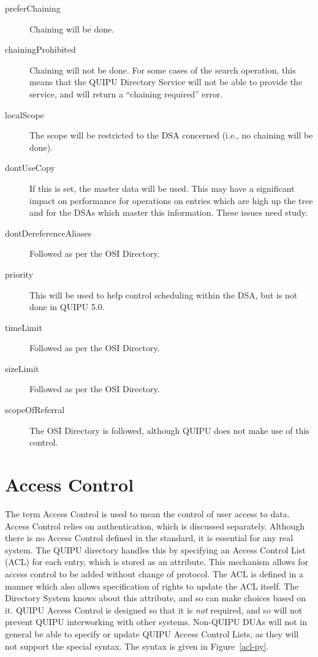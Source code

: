 \begin {description}
\item [preferChaining]
Chaining will be done.

\item [chainingProhibited]
Chaining will not be done.
For some cases of the search operation, this means that the QUIPU Directory
Service will not be able to provide the service, and will return a
``chaining required'' error.


\item [localScope]
The scope will be restricted to the DSA concerned (i.e., no chaining will be
done).

\item [dontUseCopy] If this is set, the master data will be used.  This may
have a significant impact on performance for operations on entries which are
high up the tree and for the DSAs which master this information.  These issues
need study.


\item [dontDereferenceAliases]
Followed as per the OSI Directory.

\item [priority]
This will be used to help control scheduling within the DSA, but is not done
in QUIPU 5.0.

\item [timeLimit]
Followed as per the OSI Directory.

\item [sizeLimit]
Followed as per the OSI Directory.

\item [scopeOfReferral]
The OSI Directory is followed, although QUIPU does not make use of this control.
\end {description}



\section {Access Control}
\label {acl-def}

The term Access Control is used to mean the control of user access
to data.  Access Control relies on authentication, which is discussed
separately.
Although there is no Access Control defined in the standard, it is
essential for any real system.  The QUIPU directory handles this by
specifying an Access Control List (ACL) for each entry, which is stored as
an attribute.  
This mechanism allows for access control to be added without change
of protocol.
The ACL is defined in a manner which also
allows specification of rights to update the ACL itself.  
The Directory System knows about this attribute, and
so can make choices based on it.  QUIPU Access Control is designed so that it is {\em
not} required, and so will not prevent QUIPU interworking with other
systems.  Non-QUIPU DUAs will not in general be able to specify or update
QUIPU Access Control Lists,  as they will not support the special syntax.
The syntax
is given in Figure~\ref{acl-py}.

